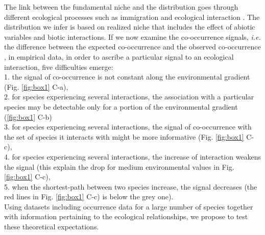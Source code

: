 The link between the fundamental niche and the distribution goes through
different ecological processes such as immigration and ecological
interaction \citep{Pulliam2000, Godsoe2010a}. The distribution we infer
is based on realized niche that includes the effect of abiotic variables
and biotic interactions. If we now examine the co-occurrence signals,
\emph{i.e.} the difference between the expected co-occurrence and the
observed co-occurrence \citep{Cazelles2016}, in empirical data, in order
to ascribe a particular signal to an ecological interaction, five
difficulties emerge:\\
1. the signal of co-occurrence is not constant along the environmental
gradient (Fig. \ref{fig:box1} C-a),\\
2. for species experiencing several interactions, the association with a
particular species may be detectable only for a portion of the
environmental gradient (\ref{fig:box1} C-b)\\
3. for species experiencing several interactions, the signal of
co-occurrence with the set of species it interacts with might be more
informative (Fig. \ref{fig:box1} C-c),\\
4. for species experiencing several interactions, the increase of
interaction weakens the signal (this explain the drop for medium
environmental values in Fig. \ref{fig:box1} C-c),\\
5. when the shortest-path between two species increase, the signal
decreases (the red lines in Fig. \ref{fig:box1} C-c) is below the grey
one).\\
Using datasets including occurrence data for a large number of species
together with information pertaining to the ecological relationships, we
propose to test these theoretical expectations.


